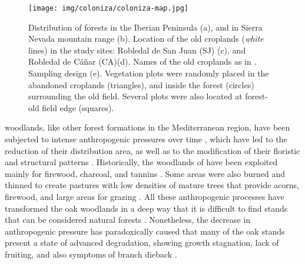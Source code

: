 \begin{figure}[]
    \centering
    \texttt{[image: img/coloniza/coloniza-map.jpg]}
    \caption{Distribution of \Qp forests in the Iberian Peninsula (a), and in Sierra Nevada mountain range (b). Location of the old croplands (\emph{white} lines) in the study sites: Robledal de San Juan (SJ) (c), and Robledal de Cáñar (CA)(d). Names of the old croplands as in . Sampling design (e). Vegetation plots were randomly placed in the abandoned croplands (triangles), and inside the forest (circles) surrounding the old field. Several plots were also located at forest-old field edge (squares).}
    \label{fig:coloniza:transects}
\end{figure}


\Qpw woodlands, like other forest formations in the Mediterranean region, have been subjected to intense anthropogenic pressures over time \autocites{GarciaJimenez20099230Robledales, AlbaSanchezetal2021EarlyAnthropogenic}, which have led to the reduction of their distribution area, as well as to the modification of their floristic and structural patterns \autocites{Gavilanetal2000EffectsDisturbance,Calvoetal1999PostfireSuccession,Tarregaetal2006ForestStructure}. Historically, the woodlands of \Qp have been exploited mainly for firewood, charcoal, and tannins \autocites{RuizdelaTorre2006FloraMayor,SanchezPalomaresetal2008EstacionesEcologicas}. Some areas were also burned and thinned to create pastures with low densities of mature trees that provide acorns, firewood, and large areas for grazing \autocites{HerreraCalvo2016UsoPastoral,Alvarezetal2009CambiosEstructura,ValbuenaCarabanaGil2017CentenaryCoppicing}. All these anthropogenic processes have transformed the oak woodlands in a deep way that it is difficult to find stands that can be considered natural forests \autocites{RuizdelaTorre2006FloraMayor}. Nonetheless, the decrease in anthropogenic pressure has paradoxically caused that many of the \Qp oak stands present a state of advanced degradation, showing growth stagnation, lack of fruiting, and also symptoms of branch dieback  \autocites{Canellasetal2004GrowthResponse, Bravoetal2008SelviculturaMontes, ValbuenaCarabanaGil2014EfectosGestion, PiqueVericat2015EvolutionPerspectives, Piqueetal2018Spain}. 


